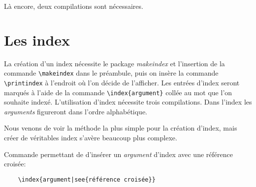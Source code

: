 Là encore, deux compilations sont nécessaires.
\medskip

\section{Les index}
La création d'un index nécessite le package \textit{makeindex} et l'insertion de la commande \verb|\makeindex| dans le préambule, puis on insère la commande \verb|\printindex| à l'endroit où l'on décide de l'afficher. Les entrées d'index seront marqués à l'aide de la commande \verb|\index{argument}| collée au mot que l'on souhaite indexé. L'utilisation d'index nécessite trois compilations. Dans l'index les \textit{arguments} figureront dans l'ordre alphabétique.
\medskip

Nous venons de voir la méthode la plus simple pour la création d'index, mais créer de véritables index s'avère beaucoup plus complexe.
\medskip

Commande permettant de d'insérer un \textit{argument} d'index avec une référence croisée:
\begin{verbatim}
    \index{argument|see{référence croisée}}
\end{verbatim}
\medskip
